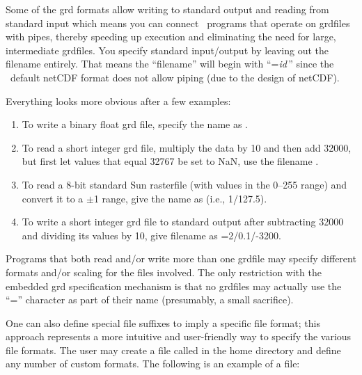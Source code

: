 Some of the grd formats allow writing to standard output and reading
from standard input which means you can connect \GMT\ programs that
operate on grdfiles with pipes, thereby speeding up execution and
eliminating the need for large, intermediate grdfiles.  You specify
standard input/output by leaving out the filename entirely.
That means the ``filename'' will begin with
``={\it id}\,'' since the \GMT\ default netCDF format does
not allow piping (due to the design of netCDF). 

Everything looks more obvious after a few examples: 

\begin{enumerate}
\item To write a binary float grd file, specify the name as .

\item To read a short integer grd file, multiply the data by 10 and then
add 32000, but first let values that equal 32767 be set to NaN,
use the filename . 

\item To read a 8-bit standard Sun rasterfile (with values in the 0--255 range)
and convert it to a $\pm$1 range, give the name as
 (i.e., 1/127.5).

\item To write a short integer grd file to standard output after subtracting
32000 and dividing its values by 10, give filename as =2/0.1/-3200. 

\end{enumerate} 

Programs that both read and/or write more than one grdfile may
specify different formats and/or scaling for the files involved.
The only restriction with the embedded grd specification mechanism
is that no grdfiles may actually use the ``=''
character as part of their name (presumably, a small sacrifice). 


One can also define special file suffixes to imply a specific file
format; this approach represents a more intuitive and user-friendly
way to specify the various file formats.  The user may create a file
called  in the home directory and define any
number of custom formats.  The following is an example of a
 file:

\vspace{\baselineskip} 

